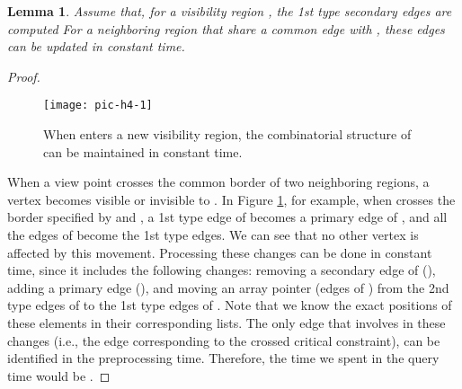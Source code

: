 \documentclass[5p]{elsarticle}
\newtheorem{lemma}[theorem]{Lemma}
\begin{document}
\begin{lemma} \label{lem:lemma4}
Assume that, for a visibility region , the 1st type secondary edges are computed
For a neighboring region that share a common edge with , these edges can be updated
in constant time.
\end{lemma}
\begin{proof}
\begin{figure}[h]
  \centering
  \texttt{[image: pic-h4-1]}   \caption{When  enters a new visibility region, 
  the combinatorial structure of  can be maintained in constant time.}
  \label{fig:h4}
\end{figure}
When a view point  crosses the common border of two neighboring regions, 
a vertex becomes visible or invisible \cite{bose} to . 
In Figure \ref{fig:h4}, for example, when  crosses the
border specified by  and , a 1st type edge of 
becomes a primary edge of , and all the edges of  become the 1st type edges.
We can see that no other vertex is affected by this movement.
Processing these changes
can be done in constant time, since it includes the following changes:
removing a secondary edge of  (), adding a primary edge (), 
and moving an array pointer (edges of ) from the 2nd type edges of  to the 1st 
type edges of . Note that we know the exact positions of these elements in their corresponding 
lists. The only edge that involves in these changes (i.e., the edge 
corresponding to the crossed critical constraint), can be identified in the
preprocessing time. Therefore, the time we spent in the query time would be .
\end{proof}
\end{document}
